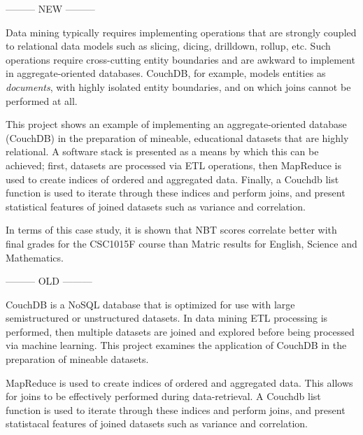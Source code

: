 --------- NEW ---------

Data mining typically requires implementing operations that are strongly coupled to relational data models such as slicing, dicing, drilldown, rollup, etc. Such operations require cross-cutting entity boundaries and are awkward to implement in aggregate-oriented databases. CouchDB, for example, models entities as \textit{documents}, with highly isolated entity boundaries, and on which joins cannot be performed at all.

This project shows an example of implementing an aggregate-oriented database (CouchDB) in the preparation of mineable, educational datasets that are highly relational. A software stack is presented as a means by which this can be achieved; first, datasets are processed via ETL operations, then MapReduce is used to create indices of ordered and aggregated data. Finally, a Couchdb list function is used to iterate through these indices and perform joins, and present statistical features of joined datasets such as variance and correlation.

In terms of this case study, it is shown that NBT scores correlate better with final grades for the CSC1015F course than Matric results for English, Science and Mathematics.


--------- OLD ---------

CouchDB is a NoSQL database that is optimized for use with large semistructured or unstructured datasets. In data mining ETL processing is performed, then multiple datasets are joined and explored before being processed via machine learning. This project examines the application of CouchDB in the preparation of mineable datasets.

MapReduce is used to create indices of ordered and aggregated data. This allows for joins to be effectively performed during data-retrieval. A Couchdb list function is used to iterate through these indices and perform joins, and present statistacal features of joined datasets such as variance and correlation.